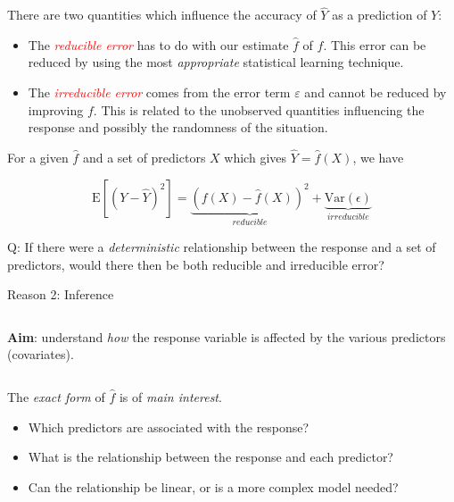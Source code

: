 \documentclass[ignorenonframetext,]{beamer}
\providecommand{\tightlist}{%
  \setlength{\itemsep}{0pt}\setlength{\parskip}{0pt}}
\begin{document}
\begin{frame}

There are two quantities which influence the accuracy of \(\hat{Y}\) as
a prediction of \(Y\):

\begin{itemize}
\tightlist
\item
  The \emph{\textcolor{red}{reducible error}} has to do with our
  estimate \(\hat{f}\) of \(f\). This error can be reduced by using the
  most \emph{appropriate} statistical learning technique.
\item
  The \emph{\textcolor{red}{irreducible error}} comes from the error
  term \(\varepsilon\) and cannot be reduced by improving \(f\). This is
  related to the unobserved quantities influencing the response and
  possibly the randomness of the situation.
\end{itemize}

For a given \(\hat{f}\) and a set of predictors \(X\) which gives
\(\hat{Y}=\hat{f}(X)\), we have

\[\text{E}[(Y-\hat{Y})^2] = \underbrace{(f(X)-\hat{f}(X))^2}_{reducible} + \underbrace{\text{Var}(\epsilon)}_{irreducible}\]

\end{frame}

\begin{frame}

\begin{block}{Q: If there were a \emph{deterministic} relationship
between the response and a set of predictors, would there then be both
reducible and irreducible error?}

\end{block}

\end{frame}

\begin{frame}

\begin{block}{Reason 2: Inference}

\(~\)

\textbf{Aim}: understand \emph{how} the response variable is affected by
the various predictors (covariates).

\(~\)

The \emph{exact form} of \(\hat{f}\) is of \emph{main interest}.

\vspace{2mm}

\begin{itemize}
\tightlist
\item
  Which predictors are associated with the response?
\item
  What is the relationship between the response and each predictor?
\item
  Can the relationship be linear, or is a more complex model needed?
\end{itemize}

\end{block}

\end{frame}
\end{document}
